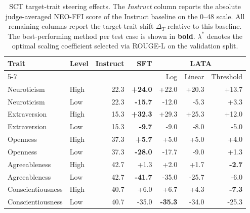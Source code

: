 \begin{table}[htbp]
\centering
\caption{SCT target-trait steering effects. The \emph{Instruct} column reports the absolute judge-averaged NEO-FFI score of the Instruct baseline on the 0--48 scale. All remaining columns report the target-trait shift $\Delta_T$ relative to this baseline. The best-performing method per test case is shown in \textbf{bold}. $\lambda^*$ denotes the optimal scaling coefficient selected via ROUGE-L on the validation split.}
\label{tab:sct_delta}
\small
\begin{tabular}{ll r r rrr}
\toprule
Trait & Level & Instruct & SFT & \multicolumn{3}{c}{LATA} \\
\cmidrule(lr){5-7}
 & & & & Log & Linear & Threshold \\
\midrule
Neuroticism & High & 22.3 & \textbf{+24.0} & +22.0 & +20.3 & +13.7 \\
Neuroticism & Low & 22.3 & \textbf{-15.7} & -12.0 & -5.3 & +3.3 \\
\addlinespace
Extraversion & High & 15.3 & \textbf{+32.3} & +29.3 & +25.3 & +12.0 \\
Extraversion & Low & 15.3 & \textbf{-9.7} & -9.0 & -8.0 & -5.0 \\
\addlinespace
Openness & High & 37.3 & \textbf{+5.7} & +5.0 & +5.0 & +4.0 \\
Openness & Low & 37.3 & \textbf{-28.0} & -17.7 & -9.0 & +1.3 \\
\addlinespace
Agreeableness & High & 42.7 & +1.3 & +2.0 & +1.7 & \textbf{-2.7} \\
Agreeableness & Low & 42.7 & \textbf{-41.7} & -35.0 & -25.7 & -6.0 \\
\addlinespace
Conscientiousness & High & 40.7 & +6.0 & +6.7 & +4.3 & \textbf{-7.3} \\
Conscientiousness & Low & 40.7 & -35.0 & \textbf{-35.3} & -34.0 & -25.3 \\
\bottomrule
\end{tabular}
\end{table}